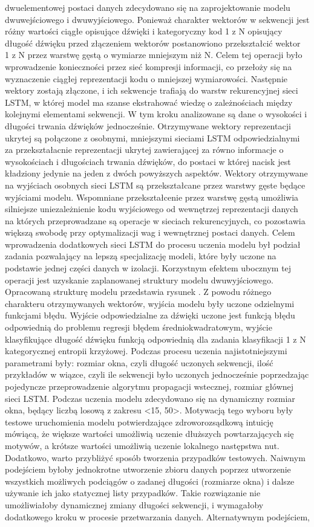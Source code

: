 dwuelementowej postaci danych zdecydowano się na zaprojektowanie modelu dwuwejściowego i dwuwyjściowego. Ponieważ charakter wektorów w sekwencji jest różny  wartości ciągłe opisujące dźwięki i  kategoryczny kod  1\,\,z\,\,N opisujący długość dźwięku  przed złączeniem wektorów postanowiono  przekształcić wektor  1\,\,z\,\,N przez warstwę gęstą o wymiarze mniejszym niż N. Celem tej operacji było wprowadzenie konieczności przez sieć kompresji informacji, co przełoży się  na wyznaczenie ciągłej reprezentacji kodu o mniejszej wymiarowości.  Następnie wektory zostają złączone, i ich sekwencje trafiają do warstw rekurencyjnej sieci LSTM, w której model ma szanse ekstrahować wiedzę o zależnościach między kolejnymi elementami sekwencji. W tym kroku analizowane są dane o wysokości i długości trwania dźwięków jednocześnie. Otrzymywane wektory reprezentacji ukrytej są połączone z osobnymi,  mniejszymi sieciami LSTM odpowiedzialnymi za przekształacnie reprezentacji  ukrytej zawierającej za równo informacje o wysokościach i długościach trwania dźwięków,  do postaci w której nacisk jest kładziony jedynie na jeden z dwóch powyższych aspektów.  Wektory otrzymywane na wyjściach osobnych sieci LSTM są przekształcane przez warstwy gęste będące wyjściami modelu.  Wspomniane przekształcenie przez warstwę gęstą umożliwia silniejsze uniezależnienie kodu  wyjściowego od wewnętrzej reprezentacji danych na których przeprowadzane są operacje  w sieciach rekurencyjnych, co pozostawia większą swobodę przy optymalizacji wag i wewnętrznej postaci danych. Celem wprowadzenia dodatkowych sieci LSTM do procesu uczenia modelu był podział zadania pozwalający na lepszą specjalizację modeli, które były uczone na podstawie jednej części danych w izolacji. Korzystnym efektem ubocznym tej operacji jest uzyskanie zaplanowanej struktury modelu dwuwyjściowego. Opracowaną strukturę modelu przedstawia rysunek . Z powodu różnego charakteru otrzymywanych wektorów, wyjścia modelu były uczone odzielnymi funkcjami błędu.  Wyjście odpowiedzialne za dźwięki uczone jest funkcją błędu odpowiednią do problemu  regresji  błędem średniokwadratowym, wyjście klasyfikujące długość dźwięku funkcją odpowiednią dla zadania klasyfikacji  1\,\,z\,\,N  kategorycznej entropii krzyżowej. Podczas procesu uczenia najistotniejszymi parametrami były:  rozmiar okna, czyli długość uczonych sekwencji,  ilość przykładów w wiązce, czyli ile sekwencji było uczonych jednocześnie poprzedzając pojedyncze przeprowadzenie algorytmu propagacji wstecznej,  rozmiar głównej sieci LSTM. Podczas uczenia modelu zdecydowano się na dynamiczny rozmiar okna, będący liczbą losową z zakresu <15, 50>. Motywacją tego wyboru były testowe  uruchomienia modelu potwierdzające zdroworozsądkową intuicję mówiącą, że większe wartości umożliwią uczenie dłuższych powtarzających się motywów, a krótsze wartości umożliwią uczenie lokalnego następstwa nut. Dodatkowo, warto przybliżyć sposób tworzenia przypadków testowych. Naiwnym podejściem byłoby jednokrotne utworzenie zbioru danych poprzez utworzenie wszystkich możliwych podciągów o zadanej długości (rozmiarze okna) i dalsze używanie ich jako statycznej listy przypadków.  Takie rozwiązanie nie umożliwiałoby dynamicznej zmiany długości sekwencji, i wymagałoby dodatkowego  kroku w procesie przetwarzania danych. Alternatywnym podejściem, 